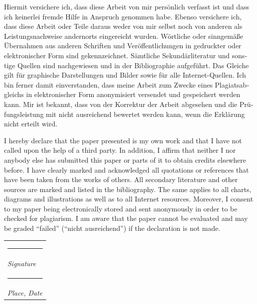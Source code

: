 \documentclass[11pt, a4paper]{article} %
\makeatletter
\newcommand{\signature}[2][5cm]{%
  \begin{tabular}{@{}p{#1}@{}}
    #2 \\[2\normalbaselineskip] \hrule \\[0pt]
    {\small \textit{Signature}} \\[2\normalbaselineskip] \hrule \\[0pt]
    {\small \textit{Place, Date}}
  \end{tabular}
}
\makeatother
\begin{document}
\begin{otherlanguage}{german}
Hiermit versichere ich, dass diese Arbeit von mir pers\"{o}nlich verfasst ist und dass ich keinerlei fremde Hilfe in Anspruch genommen habe. Ebenso versichere ich, dass diese Arbeit oder Teile daraus weder von mir selbst noch von anderen als Leistungsnachweise andernorts eingereicht wurden. W\"{o}rtliche oder sinngem\"{a}{\ss}e \"{U}bernahmen aus anderen Schriften und Ver\"{o}ffentlichungen in gedruckter oder elektronischer Form sind gekennzeichnet. S\"{a}mtliche Sekund\"{a}rliteratur und sonstige Quellen sind nachgewiesen und in der Bibliographie aufgef\"{u}hrt. Das Gleiche gilt f\"{u}r graphische Darstellungen und Bilder sowie f\"{u}r alle Internet-Quellen. Ich bin ferner damit einverstanden, dass meine Arbeit zum Zwecke eines Plagiatsabgleichs in elektronischer Form anonymisiert versendet und gespeichert werden kann. Mir ist bekannt, dass von der Korrektur der Arbeit abgesehen und die Pr\"{u}fungsleistung mit nicht ausreichend bewertet werden kann, wenn die Erkl\"{a}rung nicht erteilt wird.
\end{otherlanguage}

\vspace*{1in} %

\noindent I hereby declare that the paper presented is my own work and that I have not called upon the help of a third party. In addition, I affirm that neither I nor anybody else has submitted this paper or parts of it to obtain credits elsewhere before. I have clearly marked and acknowledged all quotations or references that have been taken from the works of others. All secondary literature and other sources are marked and listed in the bibliography. The same applies to all charts, diagrams and illustrations as well as to all Internet resources. Moreover, I consent to my paper being electronically stored and sent anonymously in order to be checked for plagiarism. I am aware that the paper cannot be evaluated and may be graded ``failed'' (``nicht ausreichend'') if the declaration is not made.\\


\hfill \signature{} 


\end{document}
